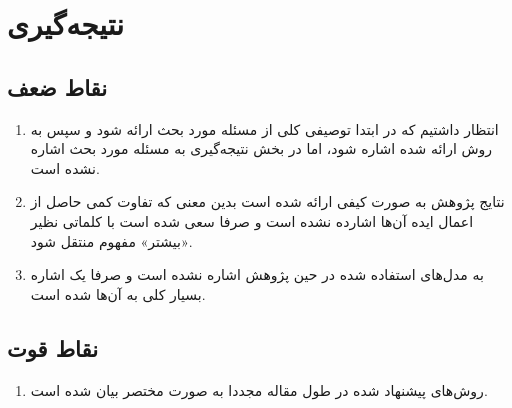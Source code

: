 \documentclass[14pt,a4]{article}
\begin{document}
\section{نتیجه‌گیری}

\subsection{نقاط ضعف}

\begin{enumerate}
    \item انتظار داشتیم که در ابتدا توصیفی کلی از مسئله مورد بحث ارائه شود و سپس به روش ارائه شده
    اشاره شود، اما در بخش نتیجه‌گیری به مسئله مورد بحث اشاره نشده است.
    \item نتایج پژوهش به صورت کیفی ارائه شده است بدین معنی که تفاوت کمی حاصل از اعمال ایده
    آن‌ها اشارده نشده است و صرفا سعی شده است با کلماتی نظیر «بیشتر» مفهوم منتقل شود.
    \item به مدل‌های استفاده شده در حین پژوهش اشاره نشده است و صرفا یک اشاره بسیار کلی به آن‌ها شده است.
\end{enumerate}

\subsection{نقاط قوت}

\begin{enumerate}
    \item روش‌های پیشنهاد شده در طول مقاله مجددا به صورت مختصر بیان شده است.
\end{enumerate}
\end{document}

